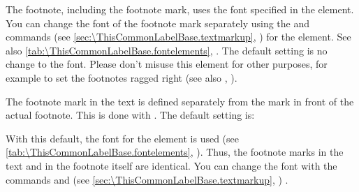 \BeginIndexGroup
{}%
%
The footnote, including the footnote mark, uses the font specified in the
 element. You can
change the font of the footnote mark separately using the 
 and
 commands (see
\autoref{sec:\ThisCommonLabelBase.textmarkup},
)
for the 
element. See also \autoref{tab:\ThisCommonLabelBase.fontelements},
.
The default setting is no change to the font.%
 Please don't misuse this element for other purposes, for example to set
the footnotes ragged right (see also ,
).

%
%
The footnote mark in the text is defined separately from the mark in
front of the actual footnote. This is done with
. The default setting is:
\begin{lstcode}
\end{lstcode}
With this default, the font for the 
element is used (see \autoref{tab:\ThisCommonLabelBase.fontelements},
). Thus, the footnote marks
in the text and in the footnote itself are identical. You can change the font
with the commands  and
 (see
\autoref{sec:\ThisCommonLabelBase.textmarkup},
)%
.

